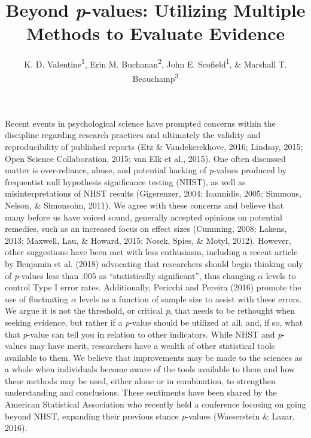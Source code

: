 \documentclass[english,mask,man]{apa6}
\title{Beyond \emph{p}-values: Utilizing Multiple Methods to Evaluate Evidence}
\author{K. D. Valentine\textsuperscript{1}, Erin M. Buchanan\textsuperscript{2}, John E. Scofield\textsuperscript{1}, \& Marshall T. Beauchamp\textsuperscript{3}}
\affiliation{
    \vspace{0.5cm}
          \textsuperscript{1} University of Missouri\\
          \textsuperscript{2} Missouri State University\\
          \textsuperscript{3} University of Missouri - Kansas City  }
\theoremstyle{definition}
\theoremstyle{definition}
\theoremstyle{definition}
\theoremstyle{remark}
\begin{document}
\maketitle

\setcounter{secnumdepth}{0}



Recent events in psychological science have prompted concerns within the
discipline regarding research practices and ultimately the validity and
reproducibility of published reports (Etz \& Vandekerckhove, 2016;
Lindsay, 2015; Open Science Collaboration, 2015; van Elk et al., 2015).
One often discussed matter is over-reliance, abuse, and potential
hacking of \emph{p}-values produced by frequentist null hypothesis
significance testing (NHST), as well as misinterpretations of NHST
results (Gigerenzer, 2004; Ioannidis, 2005; Simmons, Nelson, \&
Simonsohn, 2011). We agree with these concerns and believe that many
before us have voiced sound, generally accepted opinions on potential
remedies, such as an increased focus on effect sizes (Cumming, 2008;
Lakens, 2013; Maxwell, Lau, \& Howard, 2015; Nosek, Spies, \& Motyl,
2012). However, other suggestions have been met with less enthusiasm,
including a recent article by Benjamin et al. (2018) advocating that
researchers should begin thinking only of \emph{p}-values less than .005
as \enquote{statistically significant}, thus changing \(\alpha\) levels
to control Type I error rates. Additionally, Pericchi and Pereira (2016)
promote the use of fluctuating \(\alpha\) levels as a function of sample
size to assist with these errors. We argue it is not the threshold, or
critical \emph{p}, that needs to be rethought when seeking evidence, but
rather if a \emph{p}-value should be utilized at all, and, if so, what
that \emph{p}-value can tell you in relation to other indicators. While
NHST and \emph{p}-values may have merit, researchers have a wealth of
other statistical tools available to them. We believe that improvements
may be made to the sciences as a whole when individuals become aware of
the tools available to them and how these methods may be used, either
alone or in combination, to strengthen understanding and conclusions.
These sentiments have been shared by the American Statistical
Association who recently held a conference focusing on going beyond
NHST, expanding their previous stance \emph{p}-values (Wasserstein \&
Lazar, 2016).
\end{document}
